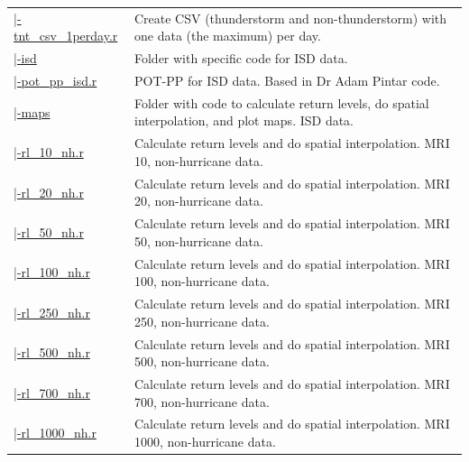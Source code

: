 \documentclass[12pt,oneside]{reedthesis}
\begin{document}
\begin{longtable}[t]{>{\raggedright\arraybackslash}p{1.3in}>{\raggedright\arraybackslash}p{4.9in}}
\href{ftp://ftp.geocorp.co/windthesis/code/pot_pp/write_t_nt_csv_one_data_per_day.r}{\;\;\;\;|-tnt\_csv\_1perday.r} & Create CSV (thunderstorm and non-thunderstorm) with one data (the maximum) per day.\\
\href{ftp://ftp.geocorp.co/windthesis/code/pot_pp/isd/}{\;\;\;\;|-isd} & Folder with specific code for ISD data.\\
\href{ftp://ftp.geocorp.co/windthesis/code/pot_pp/isd/pot_pp_isd.r}{\;\;\;\;\;\;|-pot\_pp\_isd.r} & POT-PP for ISD data. Based in Dr Adam Pintar code.\\
\href{ftp://ftp.geocorp.co/windthesis/code/pot_pp/isd/maps/}{\;\;\;\;\;\;|-maps} & Folder with code to calculate return levels, do spatial interpolation, and plot maps. ISD data.\\
\href{ftp://ftp.geocorp.co/windthesis/code/pot_pp/isd/maps/return_levels_10_nh.r}{\;\;\;\;\;\;\;\;|-rl\_10\_nh.r} & Calculate return levels and do spatial interpolation. MRI 10, non-hurricane data.\\
\href{ftp://ftp.geocorp.co/windthesis/code/pot_pp/isd/maps/return_levels_20_nh.r}{\;\;\;\;\;\;\;\;|-rl\_20\_nh.r} & Calculate return levels and do spatial interpolation. MRI 20, non-hurricane data.\\
\href{ftp://ftp.geocorp.co/windthesis/code/pot_pp/isd/maps/return_levels_50_nh.r}{\;\;\;\;\;\;\;\;|-rl\_50\_nh.r} & Calculate return levels and do spatial interpolation. MRI 50, non-hurricane data.\\
\href{ftp://ftp.geocorp.co/windthesis/code/pot_pp/isd/maps/return_levels_100_nh.r}{\;\;\;\;\;\;\;\;|-rl\_100\_nh.r} & Calculate return levels and do spatial interpolation. MRI 100, non-hurricane data.\\
\href{ftp://ftp.geocorp.co/windthesis/code/pot_pp/isd/maps/return_levels_250_nh.r}{\;\;\;\;\;\;\;\;|-rl\_250\_nh.r} & Calculate return levels and do spatial interpolation. MRI 250, non-hurricane data.\\
\href{ftp://ftp.geocorp.co/windthesis/code/pot_pp/isd/maps/return_levels_500_nh.r}{\;\;\;\;\;\;\;\;|-rl\_500\_nh.r} & Calculate return levels and do spatial interpolation. MRI 500, non-hurricane data.\\
\href{ftp://ftp.geocorp.co/windthesis/code/pot_pp/isd/maps/return_levels_700_nh.r}{\;\;\;\;\;\;\;\;|-rl\_700\_nh.r} & Calculate return levels and do spatial interpolation. MRI 700, non-hurricane data.\\
\href{ftp://ftp.geocorp.co/windthesis/code/pot_pp/isd/maps/return_levels_1000_nh.r}{\;\;\;\;\;\;\;\;|-rl\_1000\_nh.r} & Calculate return levels and do spatial interpolation. MRI 1000, non-hurricane data.\\

\end{longtable}
\end{document}
